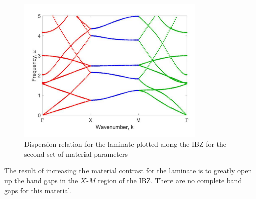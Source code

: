 \documentclass{article}
\begin{document}
\begin{figure}[!htbp]
	\centering
	\includegraphics[width=0.8\textwidth]{twodlayrd.pdf}
	\caption{Dispersion relation for the laminate plotted along the IBZ for the 
	second set of material parameters}
	\label{fig:twodlayrd}
\end{figure}
The result of increasing the material contrast for the laminate is to greatly 
open up the band gaps in the $X$-$M$ region of the IBZ. There are no complete 
band gaps for this material.
\end{document}
